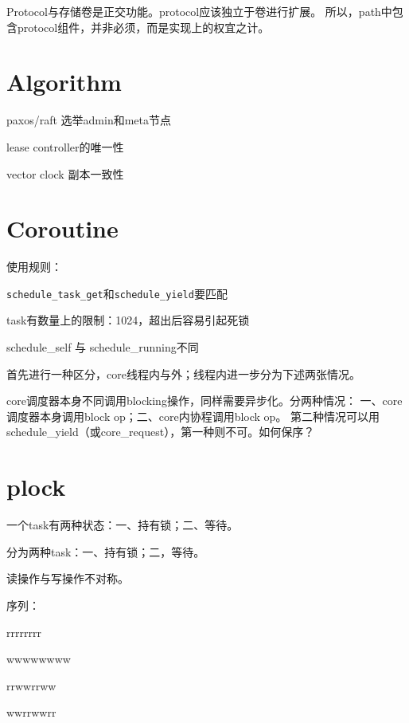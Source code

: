 Protocol与存储卷是正交功能。protocol应该独立于卷进行扩展。
所以，path中包含protocol组件，并非必须，而是实现上的权宜之计。

\section{Algorithm}

\begin{compactitem}
    \item paxos/raft 选举admin和meta节点
    \item lease controller的唯一性
    \item vector clock 副本一致性
\end{compactitem}

\section{Coroutine}

使用规则：
\begin{compactitem}
    \item \verb|schedule_task_get|和\verb|schedule_yield|要匹配
    \item task有数量上的限制：1024，超出后容易引起死锁
    \item schedule\_self 与 schedule\_running不同
\end{compactitem}

首先进行一种区分，core线程内与外；线程内进一步分为下述两张情况。

core调度器本身不同调用blocking操作，同样需要异步化。分两种情况：
一、core调度器本身调用block op；二、core内协程调用block op。
第二种情况可以用schedule\_yield（或core\_request），第一种则不可。如何保序？

\section{plock}

一个task有两种状态：一、持有锁；二、等待。

分为两种task：一、持有锁；二，等待。

读操作与写操作不对称。

序列：
\begin{enumbox}
\item rrrrrrrr
\item wwwwwwww
\item rrwwrrww
\item wwrrwwrr
\end{enumbox}

